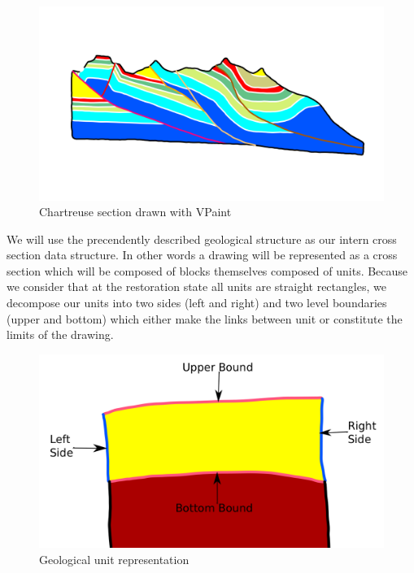 \documentclass[12pt, a4paper]{memoir} %
\begin{document}
 \begin{figure}[H]
	\centering
	\includegraphics[scale=0.5]{chartreusevpaint.png}
	\caption{Chartreuse section drawn with VPaint}
\end{figure}

We will use the precendently described geological structure as our intern cross section data structure. In other words a drawing will be represented as a cross section which will be composed of blocks themselves composed of units. Because we consider that at the restoration state all units are straight rectangles, we decompose our units into two sides (left and right) and two level boundaries (upper and bottom) which either make the links between unit or constitute the limits of the drawing. 

 \begin{figure}[H]
	\centering
	\includegraphics[scale=0.3]{unitDescriptionEdit.png}
	\caption{Geological unit representation}
\end{figure}
\end{document}
